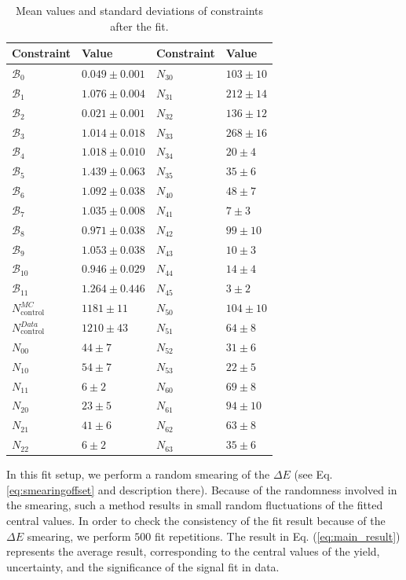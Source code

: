 \begin{table}[H]
	\centering
	\begin{tabular}{l|l||l|l}
		Constraint & Value & Constraint & Value \\
		\toprule
	$\mathcal{B}_{0}$ & $0.049 \pm 0.001$ & $N_{30}$ & $103 \pm 10$\\
	$\mathcal{B}_{1}$ & $1.076 \pm 0.004$ & $N_{31}$ & $212 \pm 14$\\
	$\mathcal{B}_{2}$ & $0.021 \pm 0.001$ & $N_{32}$ & $136 \pm 12$\\
	$\mathcal{B}_{3}$ & $1.014 \pm 0.018$ & $N_{33}$ & $268 \pm 16$\\
	$\mathcal{B}_{4}$ & $1.018 \pm 0.010$ & $N_{34}$ & $20 \pm 4$\\
	$\mathcal{B}_{5}$ & $1.439 \pm 0.063$ & $N_{35}$ & $35 \pm 6$\\
	$\mathcal{B}_{6}$ & $1.092 \pm 0.038$ & $N_{40}$ & $48 \pm 7$\\
	$\mathcal{B}_{7}$ & $1.035 \pm 0.008$ & $N_{41}$ & $7 \pm 3$\\
	$\mathcal{B}_{8}$ & $0.971 \pm 0.038$ & $N_{42}$ & $99 \pm 10$\\
	$\mathcal{B}_{9}$ & $1.053 \pm 0.038$ & $N_{43}$ & $10 \pm 3$\\
	$\mathcal{B}_{10}$ & $0.946 \pm 0.029$ & $N_{44}$ & $14 \pm 4$\\
	$\mathcal{B}_{11}$ & $1.264 \pm 0.446$ & $N_{45}$ & $3 \pm 2$\\
	$N_{\mathrm{control}}^{MC}$ & $1181 \pm 11$ & $N_{50}$ & $104 \pm 10$\\
	$N_{\mathrm{control}}^{Data}$ & $1210 \pm 43$ & $N_{51}$ & $64 \pm 8$\\
	$N_{00}$ & $44 \pm 7$ & $N_{52}$ & $31 \pm 6$\\
	$N_{10}$ & $54 \pm 7$ & $N_{53}$ & $22 \pm 5$\\
	$N_{11}$ & $6 \pm 2$ & $N_{60}$ & $69 \pm 8$\\
	$N_{20}$ & $23 \pm 5$ & $N_{61}$ & $94 \pm 10$\\
	$N_{21}$ & $41 \pm 6$ & $N_{62}$ & $63 \pm 8$\\
	$N_{22}$ & $6 \pm 2$ & $N_{63}$ & $35 \pm 6$\\
		\bottomrule
	\end{tabular}
	\captionsetup{width=.8\linewidth}
	\caption{Mean values and standard deviations of constraints after the fit.}
	\label{tab:constraints}
\end{table}

In this fit setup, we perform a random smearing of the $\Delta E$ (see Eq. \ref{eq:smearingoffset} and description there). Because of the randomness involved in the smearing, such a method results in small random fluctuations of the fitted central values. In order to check the consistency of the fit result because of the $\Delta E$ smearing, we perform $500$ fit repetitions. The result in Eq. (\ref{eq:main_result}) represents the average result, corresponding to the central values of the yield, uncertainty, and the significance of the signal fit in data.


